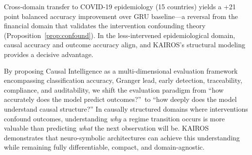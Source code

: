 \documentclass[11pt]{article}
\begin{document}
Cross-domain transfer to COVID-19 epidemiology (15 countries) yields a +21 point balanced accuracy improvement over GRU baseline---a reversal from the financial domain that validates the intervention confounding theory (Proposition~\ref{prop:confound}). In the less-intervened epidemiological domain, causal accuracy and outcome accuracy align, and KAIROS's structural modeling provides a decisive advantage.

By proposing Causal Intelligence as a multi-dimensional evaluation framework encompassing classification accuracy, Granger lead, early detection, traceability, compliance, and auditability, we shift the evaluation paradigm from ``how accurately does the model predict outcomes?''\ to ``how deeply does the model understand causal structure?'' In causally structured domains where interventions confound outcomes, understanding \emph{why} a regime transition occurs is more valuable than predicting \emph{what} the next observation will be. KAIROS demonstrates that neuro-symbolic architectures can achieve this understanding while remaining fully differentiable, compact, and domain-agnostic.
\end{document}
